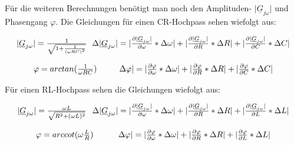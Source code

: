 \documentclass[12pt,a4paper,twoside]{article}
\begin{document}
\noindent
Für die weiteren Berechnungen benötigt man noch den Amplituden- $\vert \underline{G}_{j \omega} \vert$ und Phasengang $\varphi$. 
Die Gleichungen für einen CR-Hochpass sehen wiefolgt aus: 

\begin{equation}
    \label{eq:Amplitudengang CR-HP}
    \centerline{$\vert \underline{G}_{j \omega} \vert = \frac{1}{\sqrt{1+\frac{1}{(\omega RC)^2}}}$ \\ $\Delta \vert \underline{G}_{j \omega} \vert = \vert \frac{\partial \vert \underline{G}_{j \omega} \vert}{\partial \omega} * \Delta \omega \vert + \vert \frac{\partial \vert \underline{G}_{j \omega} \vert}{\partial R} * \Delta R \vert + \vert \frac{\partial \vert \underline{G}_{j \omega} \vert}{\partial C} * \Delta C \vert$}
\end{equation}

\begin{equation}
    \label{eq:Phasengang CR-HP}
    \centerline{$\varphi = arctan(\frac{1}{\omega RC})$ \\ $\Delta \varphi \vert = \vert \frac{\partial \varphi}{\partial \omega} * \Delta \omega \vert + \vert \frac{\partial \varphi}{\partial R} * \Delta R \vert + \vert \frac{\partial \varphi}{\partial C} * \Delta C \vert$}
\end{equation}

\noindent
Für einen RL-Hochpass sehen die Gleichungen wiefolgt aus: 

\begin{equation}
    \label{eq:Amplitudengang RL-HP}
    \centerline{$\vert \underline{G}_{j \omega} \vert = \frac{\omega L}{\sqrt{R^2 + (\omega L)^2}}$ \\ $\Delta \vert \underline{G}_{j \omega} \vert = \vert \frac{\partial \vert \underline{G}_{j \omega} \vert}{\partial \omega} * \Delta \omega \vert + \vert \frac{\partial \vert \underline{G}_{j \omega} \vert}{\partial R} * \Delta R \vert + \vert \frac{\partial \vert \underline{G}_{j \omega} \vert}{\partial L} * \Delta L \vert$}
\end{equation}

\begin{equation}
    \label{eq:Phasengang RL-HP}
    \centerline{$\varphi = arccot( \omega \frac{L}{R})$ \\ $\Delta \varphi \vert = \vert \frac{\partial \varphi}{\partial \omega} * \Delta \omega \vert + \vert \frac{\partial \varphi}{\partial R} * \Delta R \vert + \vert \frac{\partial \varphi}{\partial L} * \Delta L \vert$}
\end{equation}
\end{document}
